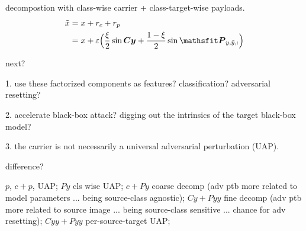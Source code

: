 \documentclass[review]{cvpr}
\begin{document}
decompostion with class-wise carrier + class-target-wise payloads.
\begin{align}
	\tilde{x} &= x + r_c + r_p \\
	&= x + \varepsilon \Big(\frac{\xi}{2}\sin \mC \vy + \frac{1-\xi}{2} \sin \tP_{y,\tilde{y},:} \Big)
\end{align}

next?

1. use these factorized components as features? classification? adversarial resetting?

2. accelerate black-box attack? digging out the intrinsics of the target black-box model?

3. the carrier is not necessarily a universal adversarial perturbation (UAP).

difference?

$p$, $c+p$, UAP; $Py$ cls wise UAP;
$c+Py$ coarse decomp (adv ptb more related to model parameters ... being source-class agnostic);
$Cy+Pyy$ fine decomp (adv ptb more related to source image ... being source-class sensitive ... chance for adv resetting);
$Cyy+Pyy$ per-source-target UAP;


{\small


}
\end{document}
